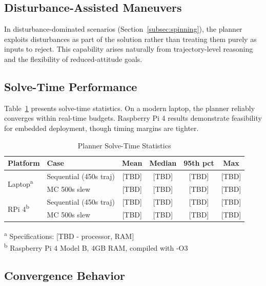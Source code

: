 \documentclass[conference]{IEEEtran}
\begin{document}
\subsection{Disturbance-Assisted Maneuvers}\label{subsec:disturbance_assisted}

In disturbance-dominated scenarios (Section~\ref{subsec:spinning}), the planner exploits disturbances as part of the solution rather than treating them purely as inputs to reject. This capability arises naturally from trajectory-level reasoning and the flexibility of reduced-attitude goals.

\subsection{Solve-Time Performance}\label{subsec:solve_time}

Table~\ref{tab:solve_time} presents solve-time statistics. On a modern laptop, the planner reliably converges within real-time budgets. Raspberry Pi 4 results demonstrate feasibility for embedded deployment, though timing margins are tighter.

\begin{table}[t]
    \centering
    \caption{Planner Solve-Time Statistics}
    \label{tab:solve_time}
    \begin{tabular}{llcccc}
        \toprule
        Platform & Case & Mean & Median & 95th pct & Max \\
        \midrule
        \multirow{2}{*}{Laptop\textsuperscript{a}}
            & Sequential (450s traj) & [TBD] & [TBD] & [TBD] & [TBD] \\
            & MC 500s slew & [TBD] & [TBD] & [TBD] & [TBD] \\
        \midrule
        \multirow{2}{*}{RPi 4\textsuperscript{b}}
            & Sequential (450s traj) & [TBD] & [TBD] & [TBD] & [TBD] \\
            & MC 500s slew & [TBD] & [TBD] & [TBD] & [TBD] \\
        \bottomrule
    \end{tabular}
    \begin{flushleft}
    \textsuperscript{a} Specifications: [TBD - processor, RAM] \\
    \textsuperscript{b} Raspberry Pi 4 Model B, 4GB RAM, compiled with -O3
    \end{flushleft}
\end{table}

\subsection{Convergence Behavior}\label{subsec:convergence}
\end{document}
